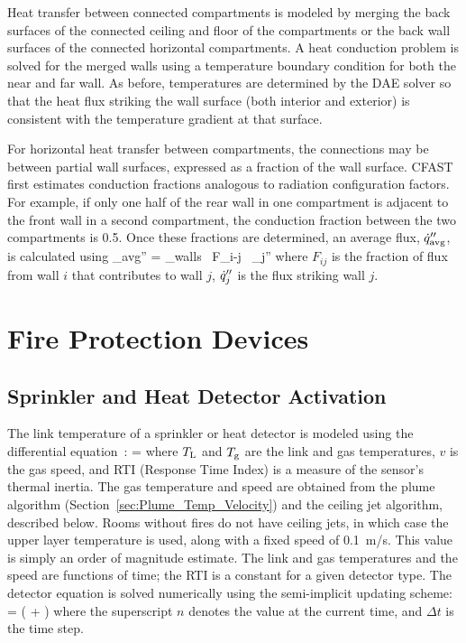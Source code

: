 \documentclass[12pt]{book}
\begin{document}
Heat transfer between connected compartments is modeled by merging the back surfaces of the connected ceiling and floor of the compartments or the back wall surfaces of the connected horizontal compartments.  A heat conduction problem is solved for the merged walls using a temperature boundary condition for both the near and far wall.  As before, temperatures are determined by the DAE solver so that the heat flux striking the wall surface (both interior and exterior) is consistent with the temperature gradient at that surface.

For horizontal heat transfer between compartments, the connections may be between partial wall surfaces, expressed as a fraction of the wall surface. CFAST first estimates conduction fractions analogous to radiation configuration factors. For example, if only one half of the rear wall in one compartment is adjacent to the front wall in a second compartment, the conduction fraction between the two compartments is 0.5. Once these fractions are determined, an average flux, $\dot{q}_{\rm avg}''$, is calculated using
\be
   \dq_{\rm avg}'' = \sum_{\rm walls} \, F_{i-j} \, \dq_j''
\ee
where $F_{ij}$ is the fraction of flux from wall $i$ that contributes to wall $j$, $\dot{q}_j''$ is the flux striking wall $j$.



\chapter{Fire Protection Devices}



\section{Sprinkler and Heat Detector Activation}

The link temperature of a sprinkler or heat detector is modeled using the differential equation~\cite{Schifiliti:2002}:
\be
    =  \brackets{\Tg - \TL}  \label{eq:RTI}
\ee
where $T_{\rm L}$ and $T_{\rm g}$ are the link and gas temperatures, $v$ is the gas speed, and RTI (Response Time Index) is a measure of the sensor's thermal inertia. The gas temperature and speed are obtained from the plume algorithm (Section~\ref{sec:Plume_Temp_Velocity}) and the ceiling jet algorithm, described below. Rooms without fires do not have ceiling jets, in which case the upper layer temperature is used, along with a fixed speed of 0.1~m/s. This value is simply an order of magnitude estimate. The link and gas temperatures and the speed are functions of time; the RTI is a constant for a given detector type. The detector equation is solved numerically using the semi-implicit updating scheme:
\be
    =  \left(    +    \right) \label{eq:RTI_rewritten}
\ee
where the superscript $n$ denotes the value at the current time, and $\Delta t$ is the time step.
\end{document}
